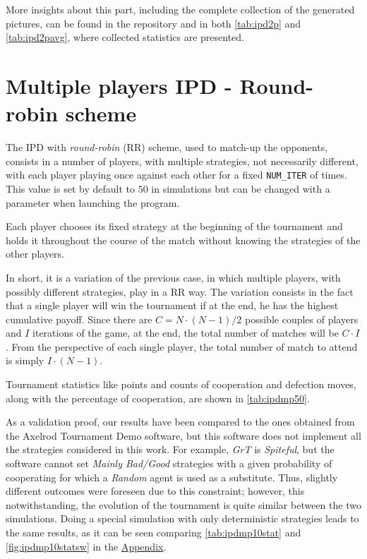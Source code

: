 \documentclass[journal,10pt,twoside]{IEEEtran}
\begin{document}
More insights about this part, including the complete collection of the generated pictures, can be found in the repository and in both \autoref{tab:ipd2p} and \autoref{tab:ipd2pavg}, where collected statistics are presented.

\section{Multiple players IPD - Round-robin scheme} \label{s:IPDMP}
The IPD with \textit{round-robin} (RR) scheme, used to match-up the opponents, consists in a number of players, with multiple strategies, not necessarily different, with each player playing once against each other for a fixed \texttt{NUM\_ITER} of times. This value is set by default to $50$ in simulations but can be changed with a parameter when launching the program.

Each player chooses its fixed strategy at the beginning of the tournament and holds it throughout the course of the match without knowing the strategies of the other players.

In short, it is a variation of the previous case, in which multiple players, with possibly different strategies, play in a RR way. The variation consists in the fact that a single player will win the tournament if at the end, he has the highest cumulative payoff.
Since there are $C=N\cdot (N-1)/2$ possible couples of players and $I$ iterations of the game, at the end, the total number of matches will be $C\cdot I$. From the perspective of each single player, the total number of match to attend is simply $I\cdot(N-1)$.

Tournament statistics like points and counts of cooperation and defection moves, along with the percentage of cooperation, are shown in \autoref{tab:ipdmp50}.

As a validation proof, our results have been compared to the ones obtained from the Axelrod Tournament Demo software, \cite{demosw} but this software does not implement all the strategies considered in this work. For example, \textit{GrT} is \textit{Spiteful}, but the software cannot set \textit{Mainly Bad/Good} strategies with a given probability of cooperating for which a \textit{Random} agent is used as a substitute. Thus, slightly different outcomes were foreseen due to this constraint; however, this notwithstanding, the evolution of the tournament is quite similar between the two simulations.
Doing a special simulation with only deterministic strategies leads to the same results, as it can be seen comparing \autoref{tab:ipdmp10stat} and \autoref{fig:ipdmp10statsw} in the \hyperref[s:appendix]{Appendix}.
\end{document}
